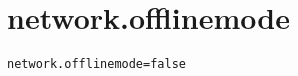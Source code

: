 \section{network.offlinemode}
\label{configuration:NetworkOfflinemode}
\AvailableInJavaAndCsharp{\TODO}
\begin{lstlisting}[style=Props,caption={Usage example for \textit{network.offlinemode}}]
network.offlinemode=false
\end{lstlisting}
